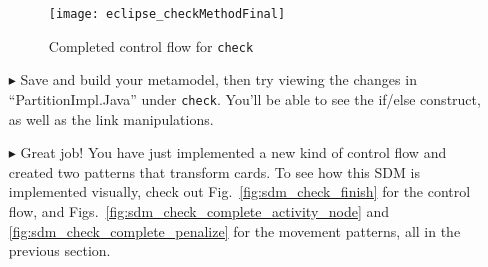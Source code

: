 \begin{itemize}
\vspace{0.5cm}

\begin{figure}[htbp]
\begin{center}
  \texttt{[image: eclipse\_checkMethodFinal]}
  \caption{Completed control flow for \texttt{check}}
  \label{fig:finalMethod}
\end{center}
\end{figure}

\item[$\blacktriangleright$] Save and build your metamodel, then try viewing the changes in ``PartitionImpl.Java'' under \texttt{check}. You'll be able to
see the if/else construct, as well as the link manipulations. 

\item[$\blacktriangleright$] Great job! You have just implemented a new kind of control flow and created two patterns that transform cards.
To see how this SDM is implemented visually, check out Fig.~\ref{fig:sdm_check_finish} for the control flow, and Figs.~\ref{fig:sdm_check_complete_activity_node} and
\ref{fig:sdm_check_complete_penalize} for the movement patterns, all in the previous section.

\end{itemize}
 